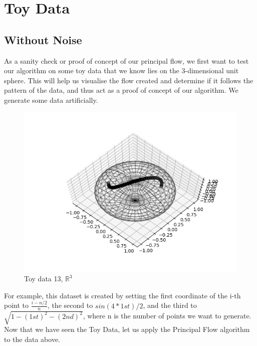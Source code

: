 \documentclass[12pt]{report}
\begin{document}
\section{Toy Data}

\subsection{Without Noise}

As a sanity check or proof of concept of our principal flow, 
we first want to test our algorithm on some toy data that we know 
lies on the 3-dimensional unit sphere. This will help us visualise the flow created
and determine if it follows the pattern of the data, 
and thus act as a proof of concept of
our algorithm. We generate some data artificially.


\begin{figure}[h]
    \begin{center}
        \includegraphics[]{Data_13.png}
        \caption{Toy data 13, $\mathbb{R}^3$}
        \label{fig:toydata}
    \end{center}
\end{figure}

\newpage

For example, this dataset is created by setting the first coordinate of the 
i-th point to $\frac{i-n/2}{n}$, the second to $sin(4*1st)/2$, and the third to 
$\sqrt{1-(1st)^2 - (2nd)^2}$, where n is the number of points we want to generate.\\
Now that we have seen the Toy Data, let us apply the Principal Flow 
algorithm to the data above.
\end{document}
